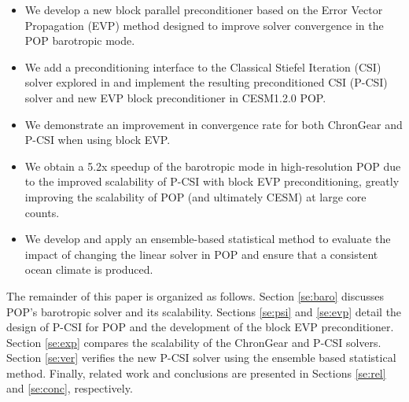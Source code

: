 

\begin{itemize}
\item We develop a new block parallel preconditioner based on the
Error Vector Propagation (EVP) method \cite{roache1995elliptic} designed to
improve solver convergence in the POP barotropic mode.
\item We add a preconditioning interface to the Classical Stiefel Iteration
(CSI) solver explored in \cite{hu2013scalable} and
implement the resulting preconditioned CSI (P-CSI) solver
and new EVP block preconditioner in CESM1.2.0 POP.
\item We demonstrate an improvement in convergence rate for both ChronGear and
P-CSI when using block EVP.
\item We obtain a 5.2x speedup of
  the barotropic mode in high-resolution POP due to the improved scalability
of P-CSI with block EVP preconditioning, greatly improving the
scalability of POP (and ultimately CESM) at large core counts.
\item We develop and apply an ensemble-based statistical method to evaluate the impact
of changing the linear solver in POP and ensure that a consistent ocean climate is produced.
\end{itemize}

The remainder of this paper is organized as follows.
Section \ref{se:baro} discusses POP's barotropic solver and its scalability.
Sections \ref{se:psi} and \ref{se:evp} detail the design
of P-CSI for POP and the development of the block EVP preconditioner.
Section \ref{se:exp} compares the scalability of the ChronGear and
P-CSI solvers.  Section \ref{se:ver} verifies the new P-CSI solver
using the ensemble based statistical method.
Finally,  related work and conclusions are presented in Sections
\ref{se:rel} and \ref{se:conc}, respectively.


